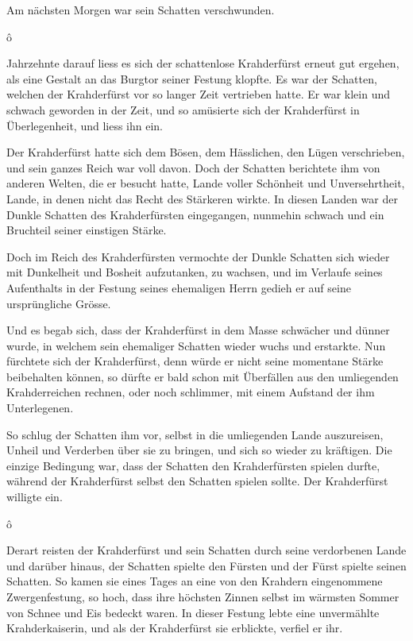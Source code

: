 \documentclass[10pt, a4paper, oneside]{book}
\newcommand{\trennzeichen}{%
    \begin{center}%
        \vspace*{-1em}
        \andorfont\Huge{ô}
    \end{center}
}
\begin{document}
Am nächsten Morgen war sein Schatten verschwunden.



\trennzeichen



Jahrzehnte darauf liess es sich der schattenlose Krahderfürst erneut gut ergehen, als eine Gestalt an das Burgtor seiner Festung klopfte. Es war der Schatten, welchen der Krahderfürst vor so langer Zeit vertrieben hatte. Er war klein und schwach geworden in der Zeit, und so amüsierte sich der Krahderfürst in Überlegenheit, und liess ihn ein.

Der Krahderfürst hatte sich dem Bösen, dem Hässlichen, den Lügen verschrieben, und sein ganzes Reich war voll davon. Doch der Schatten berichtete ihm von anderen Welten, die er besucht hatte, Lande voller Schönheit und Unversehrtheit, Lande, in denen nicht das Recht des Stärkeren wirkte. In diesen Landen war der Dunkle Schatten des Krahderfürsten eingegangen, nunmehin schwach und ein Bruchteil seiner einstigen Stärke.

Doch im Reich des Krahderfürsten vermochte der Dunkle Schatten sich wieder mit Dunkelheit und Bosheit aufzutanken, zu wachsen, und im Verlaufe seines Aufenthalts in der Festung seines ehemaligen Herrn gedieh er auf seine ursprüngliche Grösse.

Und es begab sich, dass der Krahderfürst in dem Masse schwächer und dünner wurde, in welchem sein ehemaliger Schatten wieder wuchs und erstarkte. Nun fürchtete sich der Krahderfürst, denn würde er nicht seine momentane Stärke beibehalten können, so dürfte er bald schon mit Überfällen aus den umliegenden Krahderreichen rechnen, oder noch schlimmer, mit einem Aufstand der ihm Unterlegenen.

So schlug der Schatten ihm vor, selbst in die umliegenden Lande auszureisen, Unheil und Verderben über sie zu bringen, und sich so wieder zu kräftigen. Die einzige Bedingung war, dass der Schatten den Krahderfürsten spielen durfte, während der Krahderfürst selbst den Schatten spielen sollte. Der Krahderfürst willigte ein.



\trennzeichen



Derart reisten der Krahderfürst und sein Schatten durch seine verdorbenen Lande und darüber hinaus, der Schatten spielte den Fürsten und der Fürst spielte seinen Schatten. So kamen sie eines Tages an eine von den Krahdern eingenommene Zwergenfestung, so hoch, dass ihre höchsten Zinnen selbst im wärmsten Sommer von Schnee und Eis bedeckt waren. In dieser Festung lebte eine unvermählte Krahderkaiserin, und als der Krahderfürst sie erblickte, verfiel er ihr.
\end{document}
